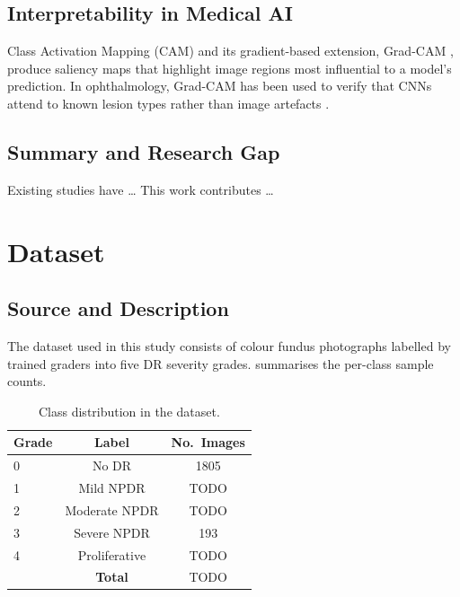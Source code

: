 \documentclass[12pt, a4paper]{article}
\begin{document}
\subsection{Interpretability in Medical AI}
\label{ssec:lit_xai}

Class Activation Mapping (CAM) and its gradient-based extension, Grad-CAM
\cite{TODO_gradcam}, produce saliency maps that highlight image regions most
influential to a model's prediction.
In ophthalmology, Grad-CAM has been used to verify that CNNs attend to known
lesion types rather than image artefacts \cite{TODO_gradcam_eye}.

\subsection{Summary and Research Gap}
\label{ssec:lit_gap}

Existing studies have \ldots
This work contributes \ldots

\section{Dataset}
\label{sec:dataset}

\subsection{Source and Description}
\label{ssec:data_source}

The dataset used in this study consists of colour fundus photographs labelled by
trained graders into five DR severity grades.
 summarises the per-class sample counts.

\begin{table}[H]
\centering
\caption{Class distribution in the dataset.}
\label{tab:class_dist}
\begin{tabular}{lcc}
\toprule
\textbf{Grade} & \textbf{Label} & \textbf{No.\ Images} \\
\midrule
0 & No DR          & 1805 \\
1 & Mild NPDR      & TODO \\
2 & Moderate NPDR  & TODO \\
3 & Severe NPDR    & 193  \\
4 & Proliferative  & TODO \\
\midrule
  & \textbf{Total} & TODO \\
\bottomrule
\end{tabular}
\end{table}
\end{document}

